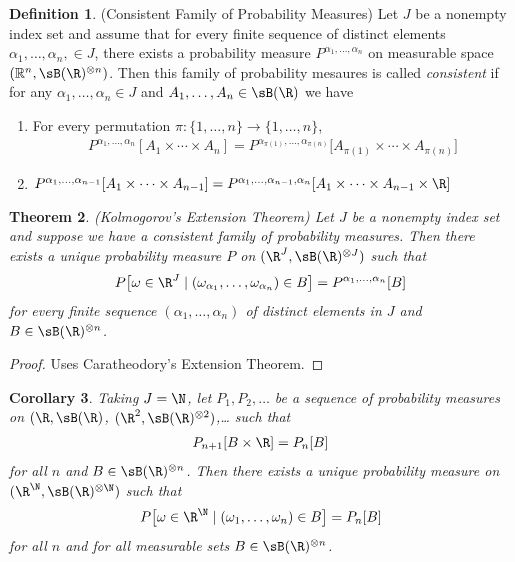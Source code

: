 \documentclass[12pt]{article}
\theoremstyle{plain}
\newtheorem{thm}{Theorem}[section]
\newtheorem{cor}[thm]{Corollary}
\theoremstyle{definition}
\newtheorem{defn}[thm]{Definition}
\theoremstyle{remark}
\newcommand{\ra}{\rightarrow}
\newcommand{\Rn}{\mathbb{R}^n}
\begin{document}
\begin{defn}(Consistent Family of Probability Measures)
\label{defn:consistent}
Let $J$ be a nonempty index set and assume that for every finite
sequence of distinct elements $\alpha_1,\ldots,\alpha_n,\in J$, there
exists a probability measure $P^{\alpha_1,\ldots,\alpha_n}$ on
measurable space $(\Rn, \sB(\R)^{\otimes n})$. Then this family of
probability mesaures is called \emph{consistent} if for any
$\alpha_1,\ldots,\alpha_n\in J$ and $A_1,\ldots,A_n\in\sB(\R)$ we have
\begin{enumerate}[label=(\roman*)]
  \item For every permutation $\pi: \{1,\ldots,n\}\ra \{1,\ldots,n\}$,
    \begin{align*}
      P^{\alpha_1,\ldots,\alpha_n}[A_1\times \cdots \times A_n]
      =
      P^{\alpha_{\pi(1)},\ldots,\alpha_{\pi(n)}}\big[
          A_{\pi(1)}\times \cdots \times A_{\pi(n)}
      \big]
    \end{align*}
  \item
      $P^{\alpha_1,\ldots,\alpha_{n-1}}[A_1\times \cdots \times A_{n-1}]
      =
      P^{\alpha_1,\ldots,\alpha_{n-1},\alpha_n}[
        A_1\times \cdots \times A_{n-1} \times \R]
      $
\end{enumerate}
\end{defn}

\begin{thm}\emph{(Kolmogorov's Extension Theorem)}
\label{thm:kolmogorov}
Let $J$ be a nonempty index set and suppose we have a consistent family
of probability measures. Then there exists a \emph{unique} probability
measure $P$ on $(\R^J,\sB(\R)^{\otimes J})$ such that
\begin{align*}
  P\big[
    \omega\in \R^J \; |\; (\omega_{\alpha_1},\ldots,\omega_{\alpha_n})
    \in B
  \big]
  = P^{\alpha_1,\ldots,\alpha_n}[B]
\end{align*}
for every finite sequence $(\alpha_1,\ldots,\alpha_n)$ of distinct
elements in $J$ and $B\in\sB(\R)^{\otimes n}$.
\end{thm}
\begin{proof}
Uses Caratheodory's Extension Theorem.
\end{proof}


\begin{cor}
Taking $J=\N$, let $P_1,P_2,\ldots$ be a sequence of probability
measures on
$(\R,\sB(\R)$,
$(\R^2,\sB(\R)^{\otimes 2})$,\ldots
such that
\begin{align*}
  P_{n+1}[B\times \R] = P_n[B]
\end{align*}
for all $n$ and $B\in\sB(\R)^{\otimes n}$. Then there exists a unique
probability measure on $(\R^{\N},\sB(\R)^{\otimes \N})$ such that
\begin{align*}
  P\big[
    \omega\in \R^{\N} \; |\; (\omega_{1},\ldots,\omega_{n})
    \in B
  \big]
  = P_n[B]
\end{align*}
for all $n$ and for all measurable sets $B\in\sB(\R)^{\otimes n}$.
\end{cor}
\end{document}
